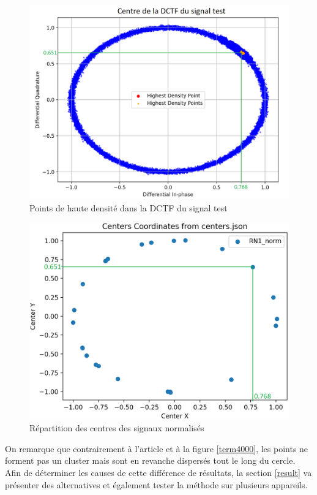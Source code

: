 \newpage

\begin{figure}[h]
\centering

\includegraphics[scale=0.3]{images/dctf6.png}
\caption{Points de haute densité dans la DCTF du signal test}\label{term319}
\end{figure}

\begin{figure}[h]
\centering

\includegraphics[scale=0.35]{images/cluster.png}
\caption{Répartition des centres des signaux normalisés}\label{term320}
\end{figure}


On remarque que contrairement à l'article et à la figure \ref{term4000}, les points ne forment pas un cluster mais sont en revanche dispersés tout le long du cercle. Afin de déterminer les causes de cette différence de résultats, la section \ref{result} va présenter des alternatives et également tester la méthode sur plusieurs appareils.

